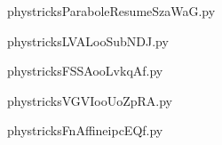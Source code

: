     

    \clearpage
    


    \newcommand{\CaptionFigParaboleResumeSzaWaG}{<+Type your caption here+>}
    \begin{center}
        
    \end{center}
    phystricksParaboleResumeSzaWaG.py

    

    \clearpage
    


    \newcommand{\CaptionFigLVALooSubNDJ}{<+Type your caption here+>}
    \begin{center}
        
    \end{center}
    phystricksLVALooSubNDJ.py

    

    \clearpage
    


    \newcommand{\CaptionFigFSSAooLvkqAf}{<+Type your caption here+>}
    \begin{center}
        
    \end{center}
    phystricksFSSAooLvkqAf.py

    

    \clearpage
    


    \newcommand{\CaptionFigVGVIooUoZpRA}{<+Type your caption here+>}
    \begin{center}
        
    \end{center}
    phystricksVGVIooUoZpRA.py

    

    \clearpage
    


    \newcommand{\CaptionFigFnAffineipcEQf}{<+Type your caption here+>}
    \begin{center}
        
    \end{center}
    phystricksFnAffineipcEQf.py

    

    \clearpage
    


